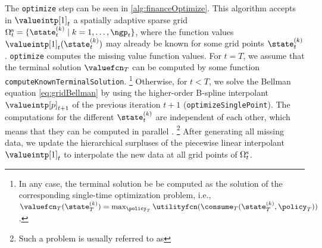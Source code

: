 The \texttt{optimize} step can be seen in \cref{alg:financeOptimize}.
This algorithm accepts in $\valueintp[1]_t$
a spatially adaptive sparse grid
$\gridset{t}{\sparse}
= \{\state_t^{(k)} \mid k = 1, \dotsc, \ngp_t\}$,
where the function values $\valueintp[1]_t(\state_t^{(k)})$
may already be known for some grid points $\state_t^{(k)}$.
\texttt{optimize} computes the missing value function values.
For $t = T$, we assume that the terminal solution
$\valuefcn_T$ can be computed by some function
\texttt{computeKnownTerminalSolution}.%
\footnote{%
  In any case, the terminal solution be be computed as the
  solution of the corresponding single-time optimization problem,
  i.e., $\valuefcn_T(\state_T^{(k)})
  = \max_{\policy_T} \utilityfcn(\consume_T(\state_T^{(k)}, \policy_T))$.%
}
Otherwise, for $t < T$, we solve the Bellman equation
\eqref{eq:gridBellman} by using the higher-order B-spline interpolant
$\valueintp[p]_{t+1}$ of the previous iteration $t + 1$
(\texttt{optimizeSinglePoint}).
The computations for the different $\state_t^{(k)}$ are
independent of each other,
which means that they can be computed in parallel \cite{Horneff16Efficient}.%
\footnote{%
  Such a problem is usually referred to as %
}
After generating all missing data,
we update the hierarchical surpluses of the
piecewise linear interpolant $\valueintp[1]_t$
to interpolate the new data at all grid points of $\gridset{t}{\sparse}$.

